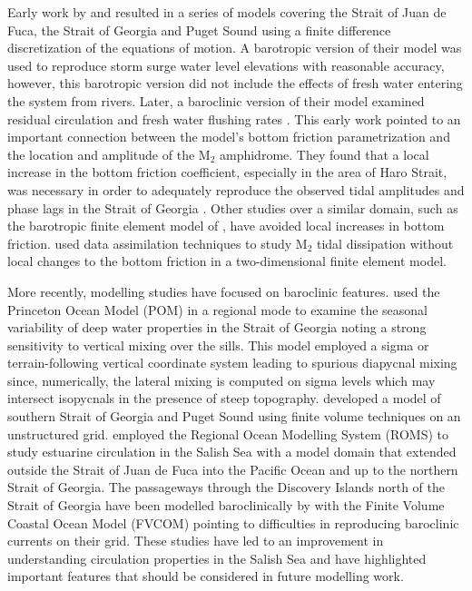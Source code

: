 \documentclass[pdftex,10pt]{article}
\begin{document}
Early work by \citet{crean1988mathematical,crean1988numerical} and \citet{stronach1993update} resulted in a series of models covering the Strait of Juan de Fuca, the Strait of Georgia and Puget Sound using a finite difference discretization of the equations of motion. A barotropic version of their model was used to reproduce storm surge water level elevations with reasonable accuracy, however, this barotropic version did not include the effects of fresh water entering the system from rivers. Later, a baroclinic version of their model examined residual circulation and fresh water flushing rates \citep{stronach1993update, marinone1996model}. This early work pointed to an important connection between the model's bottom friction parametrization and the location and amplitude of the M$_2$ amphidrome. They found that a local increase in the bottom friction coefficient, especially in the area of Haro Strait, was necessary in order to adequately reproduce the observed tidal amplitudes and phase lags in the Strait of Georgia \citep{stronach1993update}. Other studies over a similar domain, such as the barotropic finite element model of \citet{foreman1995tidal}, have avoided local increases in bottom friction. \citet{foreman2004m} used data assimilation techniques to study M$_2$ tidal dissipation without local changes to the bottom friction in a two-dimensional finite element model. 

More recently, modelling studies have focused on baroclinic features. \citet{masson2004modelling} used the Princeton Ocean Model (POM) in a regional mode to examine the seasonal variability of deep water properties in the Strait of Georgia noting a strong sensitivity to vertical mixing over the sills. This model employed a sigma or terrain-following vertical coordinate system leading to spurious diapycnal mixing since, numerically, the lateral mixing is computed on sigma levels which may intersect isopycnals in the presence of steep topography. \citet{yang2010multi} developed a model of southern Strait of Georgia and Puget Sound using finite volume techniques on an unstructured grid. \citet{sutherland2011model} employed the Regional Ocean Modelling System (ROMS) to study estuarine circulation in the Salish Sea with a model domain that extended outside the Strait of Juan de Fuca into the Pacific Ocean and up to the northern Strait of Georgia. The passageways through the Discovery Islands north of the Strait of Georgia have been modelled baroclinically by \citet{foreman2012circulation} with the Finite Volume Coastal Ocean Model (FVCOM) pointing to difficulties in reproducing baroclinic currents on their grid.  These studies have led to an improvement in understanding circulation properties in the Salish Sea and have highlighted important features that should be considered in future modelling work. 
\end{document}
